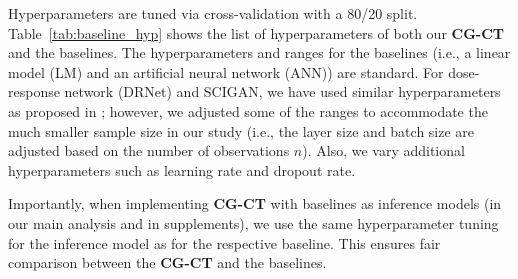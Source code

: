 \documentclass[sigconf]{acmart}
\newcommand{\framework}{\textbf{\mbox{CG-CT}}\xspace}
\begin{document}
Hyperparameters are tuned via cross-validation with a 80/20 split. Table~\ref{tab:baseline_hyp} shows the list of hyperparameters of both our \framework and the baselines. The hyperparameters and ranges for the baselines (i.e., a linear model (LM) and an artificial neural network (ANN)) are standard. For dose-response network (DRNet) and SCIGAN, we have used similar hyperparameters as proposed in \cite{Schwab2020, Bica2020}; however, we adjusted some of the ranges to accommodate the much smaller sample size in our study (i.e., the layer size and batch size are adjusted based on the number of observations $n$). Also, we vary additional hyperparameters such as learning rate and dropout rate. 

Importantly, when implementing \framework with baselines as inference models (in our main analysis and in supplements), we use the same hyperparameter tuning for the inference model as for the respective baseline. This ensures fair comparison between the \framework and the baselines. 


\end{document}
